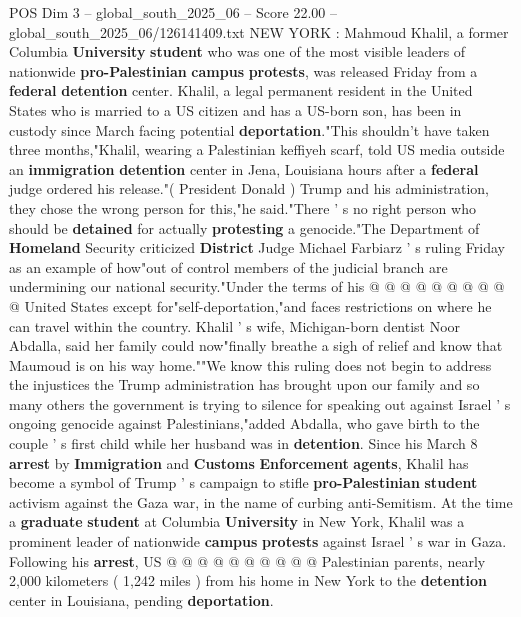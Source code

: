 \begin{textsample}{POS Dim 3 – global\_south\_2025\_06 – Score 22.00 – global\_south\_2025\_06/126141409.txt}  \label{ex:f3_pos_191}
NEW YORK : Mahmoud Khalil, a former Columbia \textbf{University} \textbf{student} who was one of the most visible leaders of nationwide \textbf{pro-Palestinian} \textbf{campus} \textbf{protests}, was released Friday from a \textbf{federal} \textbf{detention} center.
Khalil, a legal permanent resident in the United States who is married to a US citizen and has a US-born son, has been in custody since March facing potential \textbf{deportation}."This shouldn't have taken three months,"Khalil, wearing a Palestinian keffiyeh scarf, told US media outside an \textbf{immigration} \textbf{detention} center in Jena, Louisiana hours after a \textbf{federal} judge ordered his release."( President Donald ) Trump and his administration, they chose the wrong person for this,"he said."There ' s no right person who should be \textbf{detained} for actually \textbf{protesting} a genocide."The Department of \textbf{Homeland} Security criticized \textbf{District} Judge Michael Farbiarz ' s ruling Friday as an example of how"out of control members of the judicial branch are undermining our national security."Under the terms of his @ @ @ @ @ @ @ @ @ @ United States except for"self-deportation,"and faces restrictions on where he can travel within the country.
Khalil ' s wife, Michigan-born dentist Noor Abdalla, said her family could now"finally breathe a sigh of relief and know that Maumoud is on his way home.""We know this ruling does not begin to address the injustices the Trump administration has brought upon our family and so many others the government is trying to silence for speaking out against Israel ' s ongoing genocide against Palestinians,"added Abdalla, who gave birth to the couple ' s first child while her husband was in \textbf{detention}.
Since his March 8 \textbf{arrest} by \textbf{Immigration} and \textbf{Customs} \textbf{Enforcement} \textbf{agents}, Khalil has become a symbol of Trump ' s campaign to stifle \textbf{pro-Palestinian} \textbf{student} activism against the Gaza war, in the name of curbing anti-Semitism.
At the time a \textbf{graduate} \textbf{student} at Columbia \textbf{University} in New York, Khalil was a prominent leader of nationwide \textbf{campus} \textbf{protests} against Israel ' s war in Gaza.
Following his \textbf{arrest}, US @ @ @ @ @ @ @ @ @ @ Palestinian parents, nearly 2,000 kilometers ( 1,242 miles ) from his home in New York to the \textbf{detention} center in Louisiana, pending \textbf{deportation}.

\end{textsample}
